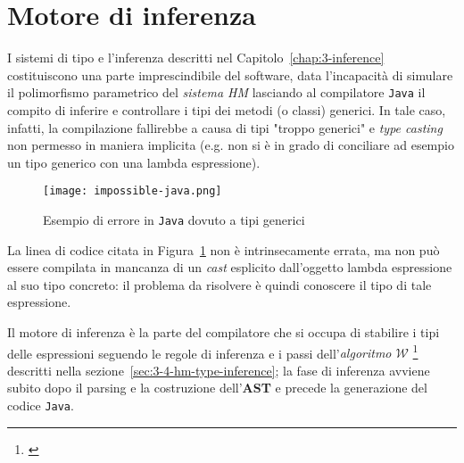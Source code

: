 \section{Motore di inferenza}
\label{sec:5-7-inference-engine}

I sistemi di tipo e l'inferenza descritti nel Capitolo~\ref{chap:3-inference} costituiscono una parte imprescindibile del software,
data l'incapacità di simulare il polimorfismo parametrico del \textit{sistema HM} lasciando al compilatore \texttt{Java}
il compito di inferire e controllare i tipi dei metodi (o classi) generici.
In tale caso, infatti, la compilazione fallirebbe a causa di tipi "troppo generici" e \textit{type casting} non permesso
in maniera implicita (e.g. non si è in grado di conciliare ad esempio un tipo generico con una lambda espressione).

\begin{figure}
    \vspace{4mm}
    \texttt{[image: impossible-java.png]}
    \caption{Esempio di errore in \texttt{Java} dovuto a tipi generici}
    \label{fig:5-impossible-java}
    \vspace{4mm}
\end{figure}

\noindent La linea di codice citata in Figura~\ref{fig:5-impossible-java} non è intrinsecamente errata,
ma non può essere compilata in mancanza di un \textit{cast} esplicito dall'oggetto lambda espressione al suo tipo concreto:
il problema da risolvere è quindi conoscere il tipo di tale espressione.


Il motore di inferenza è la parte del compilatore che si occupa di stabilire i tipi delle espressioni seguendo le regole
di inferenza e i passi dell'\textit{algoritmo $\mathcal{W}$}%
\footnote{ \cite{Grabmuller-2006-AlgorithmW}}
descritti nella sezione~\ref{sec:3-4-hm-type-inference}; la fase di inferenza avviene subito dopo il parsing
e la costruzione dell'\textbf{AST} e precede la generazione del codice \texttt{Java}.



